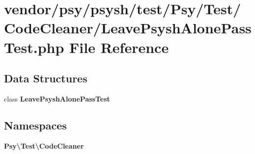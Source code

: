 \section{vendor/psy/psysh/test/\+Psy/\+Test/\+Code\+Cleaner/\+Leave\+Psysh\+Alone\+Pass\+Test.php File Reference}
\label{_leave_psysh_alone_pass_test_8php}
\subsection*{Data Structures}
\begin{DoxyCompactItemize}
\item 
class {\bf Leave\+Psysh\+Alone\+Pass\+Test}
\end{DoxyCompactItemize}
\subsection*{Namespaces}
\begin{DoxyCompactItemize}
\item 
 {\bf Psy\textbackslash{}\+Test\textbackslash{}\+Code\+Cleaner}
\end{DoxyCompactItemize}
